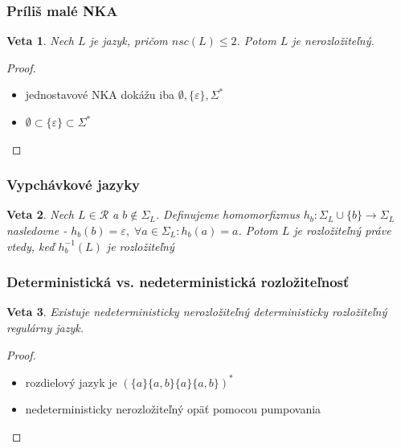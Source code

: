 \documentclass[notheorems]{beamer}
\newtheorem{theorem}{Veta}
\begin{document}
\begin{frame}
\frametitle{Príliš malé NKA}

\begin{theorem}
\label{thm:too_small_nsc}
Nech $ L $ je jazyk, pričom $ nsc(L) \leq 2 $. Potom $ L $ je nerozložiteľný.
\end{theorem}

\begin{proof}
\begin{itemize}
\item jednostavové NKA dokážu iba $ \emptyset, \lbrace \varepsilon \rbrace, \Sigma^* $
\item $ \emptyset \subset \lbrace \varepsilon \rbrace \subset \Sigma^* $
\end{itemize}
\end{proof}

\end{frame}


\begin{frame}
\frametitle{Vypchávkové jazyky}

\begin{theorem}
\label{thm:new_symbol_in_language}
Nech $ L \in \mathscr{R} $ a $ b \notin \Sigma_L $. Definujeme homomorfizmus $ h_b: \Sigma_L \cup \lbrace b \rbrace \rightarrow \Sigma_L $ nasledovne - $ h_b(b) = \varepsilon, \; \forall a \in \Sigma_L: h_b(a) = a $. Potom $ L $ je rozložiteľný práve vtedy, keď $ h_{b}^{-1}(L) $ je rozložiteľný
\end{theorem}

\end{frame}


\begin{frame}
\frametitle{Deterministická vs. nedeterministická rozložiteľnosť}

\begin{theorem}
Existuje nedeterministicky nerozložiteľný deterministicky rozložiteľný regulárny jazyk.
\end{theorem}

\begin{proof}
\begin{itemize}
\item rozdielový jazyk je $ (\lbrace a \rbrace \lbrace a,b \rbrace \lbrace a \rbrace \lbrace a,b \rbrace)^* $
\item nedeterministicky nerozložiteľný opäť pomocou pumpovania
\end{itemize}
\end{proof}

\end{frame}
\end{document}
